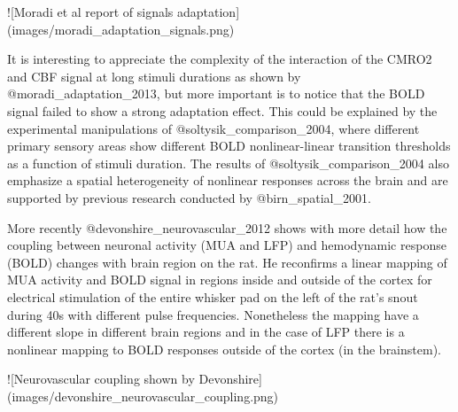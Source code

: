 ![Moradi et al report of signals adaptation](images/moradi_adaptation_signals.png)

It is interesting to appreciate the complexity of the interaction of the CMRO2 and CBF signal at long stimuli durations as shown by @moradi_adaptation_2013, but more important is to notice that the BOLD signal failed to show a strong adaptation effect. This could be explained by the experimental manipulations of @soltysik_comparison_2004, where different primary sensory areas show different BOLD nonlinear-linear transition thresholds as a function of stimuli duration. The results of @soltysik_comparison_2004 also emphasize a spatial heterogeneity of nonlinear responses across the brain and are supported by previous research conducted by @birn_spatial_2001. 

More recently @devonshire_neurovascular_2012 shows with more detail how the coupling between neuronal activity (MUA and LFP) and hemodynamic response (BOLD) changes with brain region on the rat. He reconfirms a linear mapping of MUA activity and BOLD signal in regions inside and outside of the cortex for electrical stimulation of the entire whisker pad on the left of the rat's snout during 40s with different pulse frequencies. Nonetheless the mapping have a different slope in different brain regions and in the case of LFP there is a nonlinear mapping to BOLD responses outside of the cortex (in the brainstem).

![Neurovascular coupling shown by Devonshire](images/devonshire_neurovascular_coupling.png)

